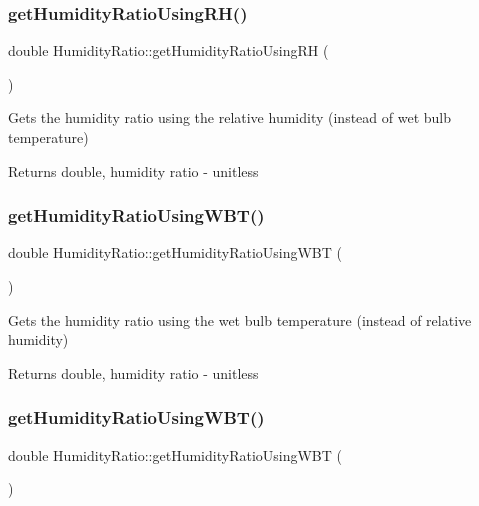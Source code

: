 \subsubsection{\texorpdfstring{get\+Humidity\+Ratio\+Using\+R\+H()}{getHumidityRatioUsingRH()}\hspace{0.1cm}{\footnotesize\ttfamily [3/3]}}
{\footnotesize\ttfamily double Humidity\+Ratio\+::get\+Humidity\+Ratio\+Using\+RH (\begin{DoxyParamCaption}{ }\end{DoxyParamCaption})}

Gets the humidity ratio using the relative humidity (instead of wet bulb temperature)

\begin{DoxyReturn}{Returns}
double, humidity ratio -\/ unitless 
\end{DoxyReturn}
\mbox{\label{class_humidity_ratio_ad33fa981783bae96c17171f12b9cf2bd}} 
\subsubsection{\texorpdfstring{get\+Humidity\+Ratio\+Using\+W\+B\+T()}{getHumidityRatioUsingWBT()}\hspace{0.1cm}{\footnotesize\ttfamily [1/3]}}
{\footnotesize\ttfamily double Humidity\+Ratio\+::get\+Humidity\+Ratio\+Using\+W\+BT (\begin{DoxyParamCaption}{ }\end{DoxyParamCaption})}

Gets the humidity ratio using the wet bulb temperature (instead of relative humidity)

\begin{DoxyReturn}{Returns}
double, humidity ratio -\/ unitless 
\end{DoxyReturn}
\mbox{\label{class_humidity_ratio_ad33fa981783bae96c17171f12b9cf2bd}} 
\subsubsection{\texorpdfstring{get\+Humidity\+Ratio\+Using\+W\+B\+T()}{getHumidityRatioUsingWBT()}\hspace{0.1cm}{\footnotesize\ttfamily [2/3]}}
{\footnotesize\ttfamily double Humidity\+Ratio\+::get\+Humidity\+Ratio\+Using\+W\+BT (\begin{DoxyParamCaption}{ }\end{DoxyParamCaption})}


